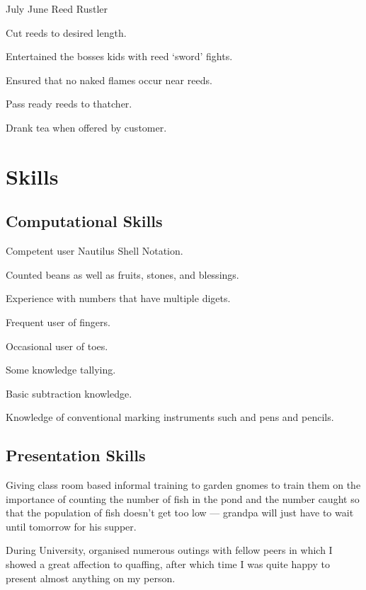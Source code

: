 \documentclass[10pt]{../bil-CV}
\begin{document}
\subsectionrule

{July }{June }
{Reed Rustler}
\begin{compactlist}
	\item{Cut reeds to desired length.}
	\item{Entertained the bosses kids with reed `sword' fights.}
	\item{Ensured that no naked flames occur near reeds.}
	\item{Pass ready reeds to thatcher.}
	\item{Drank tea when offered by customer.}
\end{compactlist}



\section{Skills}
\subsection{Computational Skills}
\begin{compactlist}
	\item{Competent user Nautilus Shell Notation.}
	\item{Counted beans as well as fruits, stones, and blessings.}
	\item{Experience with numbers that have multiple digets.}
	\item{Frequent user of fingers.}
	\item{Occasional user of toes.}
	\item{Some knowledge tallying.}
	\item{Basic subtraction knowledge.}
	\item{Knowledge of conventional marking instruments such and pens and pencils.}
\end{compactlist}

\subsectionrule

\subsection{Presentation Skills}
\begin{compactlist}
	\item{Giving class room based informal training to garden gnomes to train them on the importance of counting the number of fish in the pond and the number caught so that the population of fish doesn't get too low --- grandpa will just have to wait until tomorrow for his supper.}
	\item{During University, organised numerous outings with fellow peers in which I showed a great affection to quaffing, after which time I was quite happy to present almost anything on my person.}
\end{compactlist}
\end{document}
